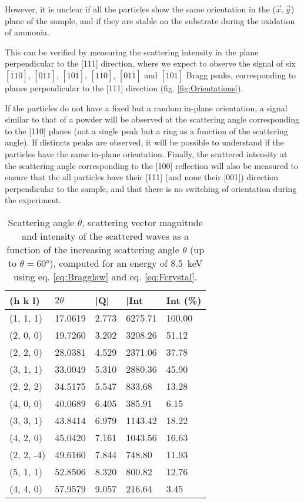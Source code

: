 However, it is unclear if all the particles show the same orientation in the ($\vec{x}, \vec{y}$) plane of the sample, and if they are stable on the substrate during the oxidation of ammonia.

This can be verified by measuring the scattering intensity in the plane perpendicular to the [111] direction, where we expect to observe the signal of six $[\bar{1}10]$, $[0\bar{1}1]$, $[10\bar{1}]$, $[1\bar{1}0]$, $[01\bar{1}]$ and $[\bar{1}01]$ Bragg peaks, corresponding to planes perpendicular to the [111] direction (fig. \ref{fig:Orientations}).

If the particles do not have a fixed but a random in-plane orientation, a signal similar to that of a powder will be observed at the scattering angle corresponding to the [110] planes (not a single peak but a ring as a function of the scattering angle).
If distincts peaks are observed, it will be possible to understand if the particles have the same in-plane orientation.
Finally, the scattered intensity at the scattering angle corresponding to the [100] reflection will also be measured to ensure that the all particles have their [111] (and none their [001]) direction perpendicular to the sample, and that there is no switching of orientation during the experiment.

\begin{table}[htb!]
\centering
    \begin{tabular}{@{}lllll@{}}
    \toprule
    (h k l) & $2\theta$ & |Q| & |Int & Int (\%) \\
    \midrule
    (1, 1, 1) & 17.0619 & 2.773 & 6275.71 & 100.00 \\
    (2, 0, 0) & 19.7260 & 3.202 & 3208.26 & 51.12 \\
    (2, 2, 0) & 28.0381 & 4.529 & 2371.06 & 37.78 \\
    (3, 1, 1) & 33.0049 & 5.310 & 2880.36 & 45.90 \\
    (2, 2, 2) & 34.5175 & 5.547 & 833.68 & 13.28 \\
    (4, 0, 0) & 40.0689 & 6.405 & 385.91 & 6.15 \\
    (3, 3, 1) & 43.8414 & 6.979 & 1143.42 & 18.22 \\
    (4, 2, 0) & 45.0420 & 7.161 & 1043.56 & 16.63 \\
    (2, 2, -4) & 49.6160 & 7.844 & 748.80 & 11.93 \\
    (5, 1, 1) & 52.8506 & 8.320 & 800.82 & 12.76 \\
    (4, 4, 0) & 57.9579 & 9.057 & 216.64 & 3.45 \\
    \bottomrule
    \end{tabular}%
    \caption{
    Scattering angle $\theta$, scattering vector magnitude and intensity of the scattered waves as a function of the increasing scattering angle $\theta$ (up to $\theta = \ang{60}$), computed for an energy of \qty{8.5}{\keV} using eq. \ref{eq:Bragglaw} and eq. \ref{eq:Fcrystal}.
    }
\label{tab:PtReflections}
\end{table}

